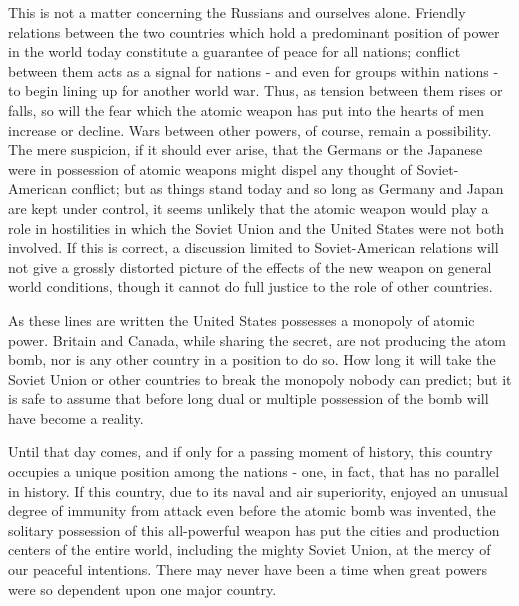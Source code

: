 This is not a matter concerning the Russians and ourselves alone. Friendly relations between the two countries which hold a predominant position of power in the world today constitute a guarantee of peace for all nations; conflict between them acts as a signal for nations - and even for groups within nations - to begin lining up for another world war. Thus, as tension between them rises or falls, so will the fear which the atomic weapon has put into the hearts of men increase or decline. Wars between other powers, of course, remain a possibility. The mere suspicion, if it should ever arise, that the Germans or the Japanese were in possession of atomic weapons might dispel any thought of Soviet-American conflict; but as things stand today and so long as Germany and Japan are kept under control, it seems unlikely that the atomic weapon would play a role in hostilities in which the Soviet Union and the United States were not both involved. If this is correct, a discussion limited to Soviet-American relations will not give a grossly distorted picture of the effects of the new weapon on general world conditions, though it cannot do full justice to the role of other countries.

As these lines are written the United States possesses a monopoly of atomic power. Britain and Canada, while sharing the secret, are not producing the atom bomb, nor is any other country in a position to do so. How long it will take the Soviet Union or other countries to break the monopoly nobody can predict; but it is safe to assume that before long dual or multiple possession of the bomb will have become a reality.

Until that day comes, and if only for a passing moment of history, this country occupies a unique position among the nations - one, in fact, that has no parallel in history. If this country, due to its naval and air superiority, enjoyed an unusual degree of immunity from attack even before the atomic bomb was invented, the solitary possession of this all-powerful weapon has put the cities and production centers of the entire world, including the mighty Soviet Union, at the mercy of our peaceful intentions. There may never have been a time when great powers were so dependent upon one major country.

